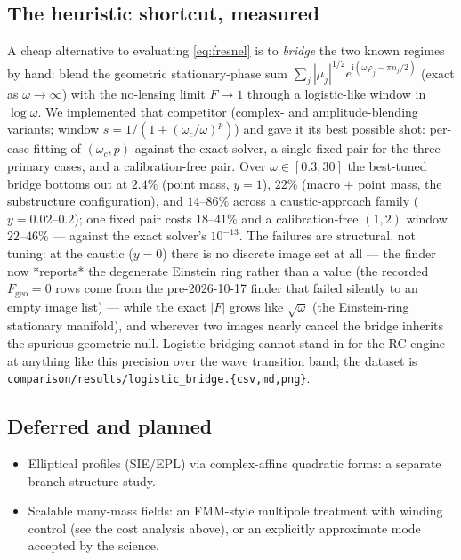 \documentclass[11pt,a4paper]{article}
\newcommand{\ii}{\mathrm{i}}
\begin{document}
\subsection{The heuristic shortcut, measured}
\label{sec:logistic}
A cheap alternative to evaluating \eqref{eq:fresnel} is to \emph{bridge}
the two known regimes by hand: blend the geometric stationary-phase sum
$\sum_j|\mu_j|^{1/2}e^{\ii(\omega\varphi_j-\pi n_j/2)}$ (exact as
$\omega\to\infty$) with the no-lensing limit $F\to1$ through a
logistic-like window in $\log\omega$.  We implemented that competitor
(complex- and amplitude-blending variants; window
$s=1/(1+(\omega_c/\omega)^p)$) and gave it its best possible shot:
per-case fitting of $(\omega_c,p)$ against the exact solver, a single
fixed pair for the three primary cases, and a calibration-free pair.
Over $\omega\in[0.3,30]$ the best-tuned bridge bottoms out at $2.4\%$
(point mass, $y=1$), $22\%$ (macro $+$ point mass, the substructure
configuration), and $14$--$86\%$ across a caustic-approach family
($y=0.02$--$0.2$); one fixed pair costs $18$--$41\%$ and a
calibration-free $(1,2)$ window $22$--$46\%$ --- against the exact
solver's $10^{-13}$.  The failures are structural, not tuning: at the
caustic ($y=0$) there is no discrete image set at all --- the finder now
*reports* the degenerate Einstein ring rather than a value (the recorded
$F_{\mathrm{geo}}=0$ rows come from the pre-2026-10-17 finder that failed
silently to an empty image list) --- while the exact $|F|$ grows like
$\sqrt{\omega}$ (the Einstein-ring stationary manifold), and wherever two
images nearly cancel the bridge inherits the spurious geometric null.  Logistic
bridging cannot stand in for the RC engine at anything like this
precision over the wave transition band; the dataset is
\texttt{comparison/results/logistic\_bridge.\{csv,md,png\}}.

\subsection{Deferred and planned}
\begin{itemize}
\item Elliptical profiles (SIE/EPL) via complex-affine quadratic forms: a
  separate branch-structure study.
\item Scalable many-mass fields: an FMM-style multipole treatment with
  winding control (see the cost analysis above), or an explicitly
  approximate mode accepted by the science.
\end{itemize}
\end{document}
